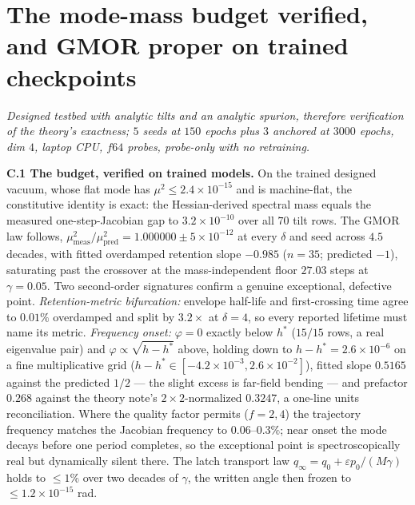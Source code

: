 \documentclass{article}
\begin{document}
\section{The mode-mass budget verified, and GMOR proper on trained checkpoints}\label{app:gmor}

\emph{Designed testbed with analytic tilts and an analytic spurion, therefore verification of the theory's exactness; $5$ seeds at $150$ epochs plus $3$ anchored at $3000$ epochs, dim $4$, laptop CPU, $f64$ probes, probe-only with no retraining.}

\textbf{C.1 The budget, verified on trained models.} On the trained designed vacuum, whose flat mode has $\mu^2\le2.4{\times}10^{-15}$ and is machine-flat, the constitutive identity is exact: the Hessian-derived spectral mass equals the measured one-step-Jacobian gap to $3.2{\times}10^{-10}$ over all $70$ tilt rows. The GMOR law follows, $\mu^2_{\mathrm{meas}}/\mu^2_{\mathrm{pred}}=1.000000\pm5{\times}10^{-12}$ at every $\delta$ and seed across $4.5$ decades, with fitted overdamped retention slope $-0.985$ ($n=35$; predicted $-1$), saturating past the crossover at the mass-independent floor $27.03$ steps at $\gamma=0.05$. Two second-order signatures confirm a genuine exceptional, defective point. \emph{Retention-metric bifurcation:} envelope half-life and first-crossing time agree to $0.01\%$ overdamped and split by $3.2\times$ at $\delta=4$, so every reported lifetime must name its metric. \emph{Frequency onset:} $\varphi=0$ exactly below $h^*$ ($15/15$ rows, a real eigenvalue pair) and $\varphi\propto\sqrt{h-h^*}$ above, holding down to $h-h^*=2.6{\times}10^{-6}$ on a fine multiplicative grid ($h-h^*\in[-4.2{\times}10^{-3},2.6{\times}10^{-2}]$), fitted slope $0.5165$ against the predicted $1/2$ --- the slight excess is far-field bending --- and prefactor $0.268$ against the theory note's $2\times2$-normalized $0.3247$, a one-line units reconciliation. Where the quality factor permits ($f=2,4$) the trajectory frequency matches the Jacobian frequency to $0.06$--$0.3\%$; near onset the mode decays before one period completes, so the exceptional point is spectroscopically real but dynamically silent there. The latch transport law $q_\infty=q_0+\varepsilon p_0/(M\gamma)$ holds to $\le1\%$ over two decades of $\gamma$, the written angle then frozen to $\le1.2{\times}10^{-15}$ rad.
\end{document}

